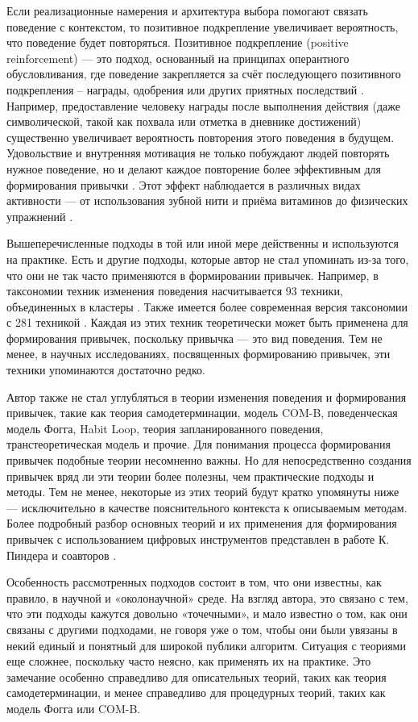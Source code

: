 \documentclass[pdflatex,sn-mathphys-num]{sn-jnl}%
\theoremstyle{thmstyleone}%
\theoremstyle{thmstyletwo}%
\theoremstyle{thmstylethree}%
\begin{document}
Если реализационные намерения и архитектура выбора помогают связать поведение с контекстом, то позитивное подкрепление увеличивает вероятность, что поведение будет повторяться. Позитивное подкрепление (positive reinforcement) — это подход, основанный на принципах оперантного обусловливания, где поведение закрепляется за счёт последующего позитивного подкрепления – награды, одобрения или других приятных последствий \cite{Skinner1953}. Например, предоставление человеку награды после выполнения действия (даже символической, такой как похвала или отметка в дневнике достижений) существенно увеличивает вероятность повторения этого поведения в будущем. Удовольствие и внутренняя мотивация не только побуждают людей повторять нужное поведение, но и делают каждое повторение более эффективным для формирования привычки \cite{Landry2019Positive}. Этот эффект наблюдается в различных видах активности — от использования зубной нити и приёма витаминов до физических упражнений \cite{Judah2018Exploratory, Fremling2025Comparing, Wiedemann2014Intrinsic}.

Вышеперечисленные подходы в той или иной мере действенны и используются на практике. Есть и другие подходы, которые автор не стал упоминать из-за того, что они не так часто применяются в формировании привычек. Например, в таксономии техник изменения поведения насчитывается 93 техники, объединенных в кластеры \cite{michie_2008_bct}. Также имеется более современная версия таксономии с 281 техникой \cite{ontology_bct}. Каждая из этих техник теоретически может быть применена для формирования привычек, поскольку привычка — это вид поведения. Тем не менее, в научных исследованиях, посвященных формированию привычек, эти техники упоминаются достаточно редко.

Автор также не стал углубляться в теории изменения поведения и формирования привычек, такие как теория самодетерминации, модель COM-B, поведенческая модель Фогга, Habit Loop, теория запланированного поведения, транстеоретическая модель и прочие. Для понимания процесса формирования привычек подобные теории несомненно важны. Но для непосредственно создания привычек вряд ли эти теории более полезны, чем практические подходы и методы. Тем не менее, некоторые из этих теорий будут кратко упомянуты ниже — исключительно в качестве пояснительного контекста к описываемым методам. Более подробный разбор основных теорий и их применения для формирования привычек с использованием цифровых инструментов представлен в работе К. Пиндера и соавторов \cite{10.1145/3196830}.

Особенность рассмотренных подходов состоит в том, что они известны, как правило, в научной и «околонаучной» среде. На взгляд автора, это связано с тем, что эти подходы кажутся довольно «точечными», и мало известно о том, как они связаны с другими подходами, не говоря уже о том, чтобы они были увязаны в некий единый и понятный для широкой публики алгоритм. Ситуация с теориями еще сложнее, поскольку часто неясно, как применять их на практике. Это замечание особенно справедливо для описательных теорий, таких как теория самодетерминации, и менее справедливо для процедурных теорий, таких как модель Фогга или COM-B.
\end{document}
